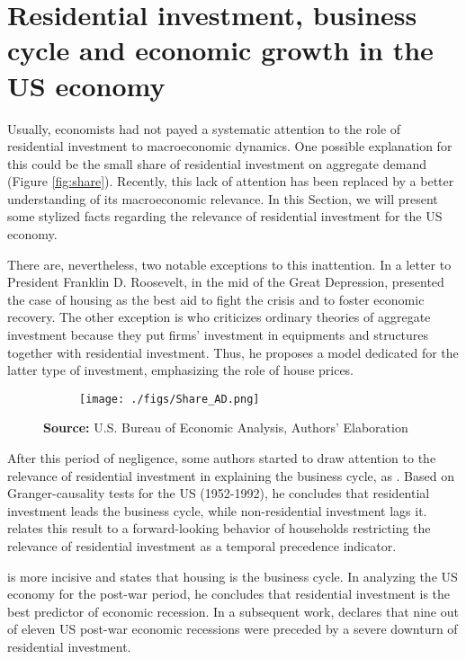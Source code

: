 \documentclass[12pt, a4paper]{article}
\begin{document}
\section{Residential investment, business cycle and economic growth in the US economy}
\label{sec:org1f9ae16}
\label{sec:Stylized_Facts}
Usually, economists had not payed a systematic attention to the role of residential investment to macroeconomic dynamics.
One possible explanation for this could be the small share of residential investment on aggregate demand (Figure \ref{fig:share}).
Recently, this lack of attention has been replaced by a better understanding of its macroeconomic relevance.
In this Section, we will present some stylized facts regarding the relevance of residential investment for the US economy.

There are, nevertheless, two notable exceptions to this inattention.
In a letter to President Franklin D. Roosevelt, in the mid of the Great Depression, \textcite[p.~436]{keynes_collected_1978} presented the case of housing as the best aid to fight the crisis and to foster economic recovery.
The other exception is \textcite{duesenberry_investment_1958} who criticizes ordinary theories of aggregate investment because they put firms’ investment in equipments and structures together with residential investment.
Thus, he proposes a model dedicated for the latter type of investment, emphasizing the role of house prices.


\begin{figure}[H]
    \centering
	\caption{Expenditures share on aggregate demand}
	\label{fig:share}
\begin{figure}[htb]
    \texttt{[image: ./figs/Share\_AD.png]}
    \end{figure}
	\caption*{\textbf{Source:} U.S. Bureau of Economic Analysis, Authors' Elaboration}
\end{figure}
After this period of negligence, some authors started to draw attention to the relevance of residential investment in explaining the business cycle, as \textcite{green_follow_1997}.
Based on Granger-causality tests for the US (1952-1992), he concludes that residential investment leads the business cycle, while non-residential investment lags it.
\textcite{green_follow_1997} relates this result to a forward-looking behavior of households restricting the relevance of residential investment as a temporal precedence indicator.

\textcite{leamer_housing_2007} is more incisive and states that housing is the business cycle.
In analyzing the US economy for the post-war period, he concludes that residential investment is the best predictor of economic recession.
In a subsequent work, \textcite{leamer_housing_2015} declares that nine out of eleven US post-war economic recessions were preceded by a severe downturn of residential investment.
\end{document}
